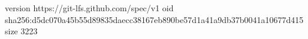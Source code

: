 version https://git-lfs.github.com/spec/v1
oid sha256:d5dc070a45b55d89835daecc38167eb890be57d1a41a9db37b0041a10677d415
size 3223
